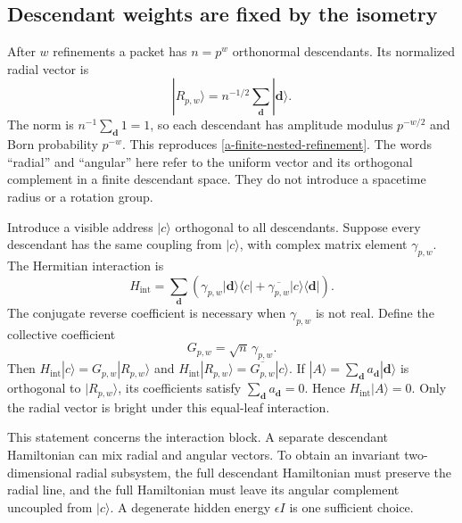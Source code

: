 \subsection{Descendant weights are fixed by the isometry}

After $w$ refinements a packet has $n=p^w$ orthonormal descendants.
Its normalized radial vector is
\begin{equation}
 |R_{p,w}\rangle=n^{-1/2}\sum_{\mathbf d}|\mathbf d\rangle.
 \label{a-finite-radial-vector}
\end{equation}
The norm is $n^{-1}\sum_{\mathbf d}1=1$, so each descendant has
amplitude modulus $p^{-w/2}$ and Born probability $p^{-w}$. This
reproduces \eqref{a-finite-nested-refinement}. The words ``radial'' and
``angular'' here refer to the uniform vector and its orthogonal
complement in a finite descendant space. They do not introduce a
spacetime radius or a rotation group.

Introduce a visible address $|c\rangle$ orthogonal to all descendants.
Suppose every descendant has the same coupling from $|c\rangle$,
with complex matrix element $\gamma_{p,w}$. The Hermitian interaction
is
\begin{equation}
 H_{\mathrm{int}}=
 \sum_{\mathbf d}
 \left(\gamma_{p,w}|\mathbf d\rangle\langle c|
       +\overline{\gamma_{p,w}}|c\rangle\langle\mathbf d|\right).
 \label{a-finite-leaf-interaction}
\end{equation}
The conjugate reverse coefficient is necessary when
$\gamma_{p,w}$ is not real. Define the collective coefficient
\begin{equation}
 G_{p,w}=\sqrt n\,\gamma_{p,w}.
 \label{a-finite-collective-coefficient}
\end{equation}
Then $H_{\mathrm{int}}|c\rangle=G_{p,w}|R_{p,w}\rangle$ and
$H_{\mathrm{int}}|R_{p,w}\rangle=
\overline{G_{p,w}}|c\rangle$. If
$|A\rangle=\sum_{\mathbf d}a_{\mathbf d}|\mathbf d\rangle$
is orthogonal to $|R_{p,w}\rangle$, its coefficients satisfy
$\sum_{\mathbf d}a_{\mathbf d}=0$. Hence
$H_{\mathrm{int}}|A\rangle=0$. Only the radial vector is bright
under this equal-leaf interaction.

This statement concerns the interaction block. A separate descendant
Hamiltonian can mix radial and angular vectors. To obtain an invariant
two-dimensional radial subsystem, the full descendant Hamiltonian
must preserve the radial line, and the full Hamiltonian must leave its
angular complement uncoupled from $|c\rangle$. A degenerate hidden
energy $\epsilon I$ is one sufficient choice.

